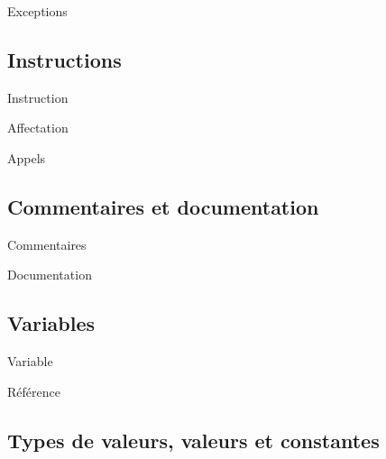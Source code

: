 \begin{frame}{Exceptions} %

\end{frame}

\subsection{Instructions}

\begin{frame}{Instruction}

\end{frame}

\begin{frame}{Affectation}

\end{frame}

\begin{frame}{Appels}

\end{frame}

\subsection{Commentaires et documentation}

\begin{frame}{Commentaires}

\end{frame}

\begin{frame}{Documentation}

\end{frame}

\subsection{Variables}

\begin{frame}{Variable}

\end{frame}

\begin{frame}{Référence}

\end{frame}

\subsection{Types de valeurs, valeurs et constantes}

